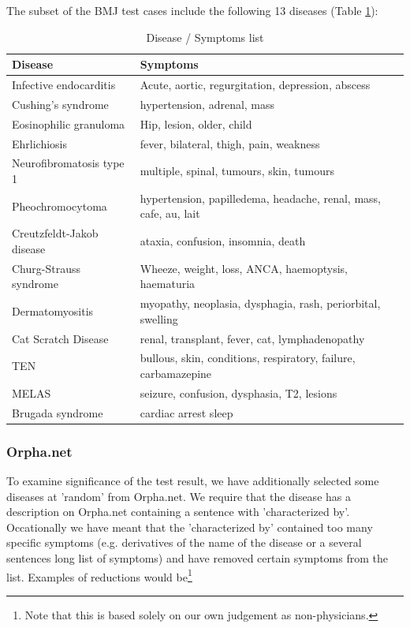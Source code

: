 The subset of the BMJ test cases include the following 13 diseases (Table \ref{BMJCases}):

\begin{table}[!h]
\caption{Disease / Symptoms list}
\label{BMJCases}
\begin{tabular}{|l|p{7cm}|}
\hline
Disease & Symptoms \\
\hline
Infective endocarditis & Acute, aortic,  regurgitation, depression,  abscess \\
\hline
Cushing's syndrome & hypertension, adrenal, mass \\
\hline
Eosinophilic granuloma & Hip, lesion, older, child \\
\hline
Ehrlichiosis & fever, bilateral, thigh, pain, weakness \\
\hline
Neurofibromatosis type 1 & multiple, spinal, tumours, skin, tumours \\
\hline
Pheochromocytoma & hypertension, papilledema, headache, renal, mass, cafe, au, lait \\
\hline
Creutzfeldt-Jakob disease & ataxia, confusion, insomnia, death \\
\hline
Churg-Strauss syndrome & Wheeze, weight, loss, ANCA, haemoptysis, haematuria \\
\hline
Dermatomyositis & myopathy, neoplasia, dysphagia, rash, periorbital, swelling \\
\hline
Cat Scratch Disease & renal, transplant, fever, cat, lymphadenopathy \\
\hline
TEN & bullous, skin, conditions, respiratory, failure, carbamazepine \\
\hline
MELAS & seizure, confusion, dysphasia, T2, lesions \\
\hline
Brugada syndrome & cardiac arrest sleep \\
\hline
\end{tabular}
\end{table}

\subsubsection{Orpha.net}
To examine significance of the test result, we have additionally
selected some diseases at 'random' from Orpha.net. We require that the
disease has a description on Orpha.net containing a sentence with
'characterized by'. Occationally we have meant that the 'characterized
by' contained too many specific symptoms (e.g. derivatives of the name
of the disease or a several sentences long list of symptoms) and have
removed certain symptoms from the list. Examples of reductions would
be\footnote{Note that this is based solely on our own judgement as
  non-physicians.}\\

